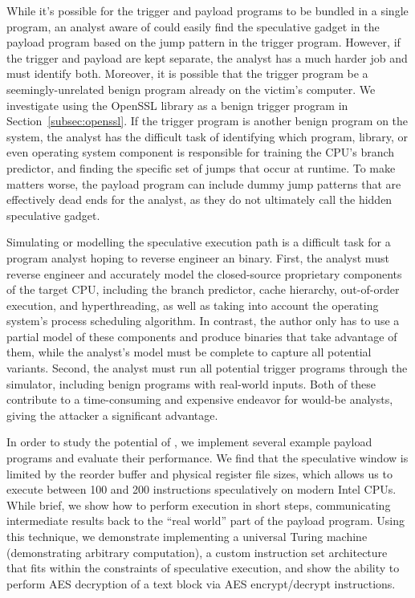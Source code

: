 

\FigHighLevel



While it's possible for the trigger and payload programs to be bundled in a
single program, an analyst aware of \speculake could easily find the speculative
gadget in the payload program based on the jump pattern in the trigger program.
However, if the trigger and payload are kept separate, the analyst has a much
harder job and must identify both.
Moreover, it is possible that the trigger program be a
seemingly-unrelated benign program already on the victim's computer. We
investigate using the OpenSSL library as a benign trigger
program in Section~\ref{subsec:openssl}. If the trigger program is another benign
program on the system, the analyst has the difficult task of identifying which
program, library, or even operating system component is responsible for training
the CPU's branch predictor, and finding the specific set of jumps that occur at
runtime. To make matters worse, the payload program can include dummy jump
patterns that are effectively dead ends for the analyst, as they do not
ultimately call the hidden speculative gadget.


Simulating or modelling the speculative execution path is a difficult task for a
program analyst hoping to reverse engineer an \speculake binary. First, the
analyst must reverse engineer and accurately model the closed-source proprietary
components of the target CPU, including the branch predictor, cache hierarchy,
out-of-order execution, and hyperthreading, as well as taking into account the
operating system's process scheduling algorithm. In contrast, the \speculake
author only has to use a partial model of these components and produce binaries
that take advantage of them, while the analyst's model must be complete to
capture all potential \speculake variants. Second, the analyst must run all
potential trigger programs through the simulator, including benign programs with
real-world inputs. Both of these contribute to a time-consuming and expensive
endeavor for would-be analysts, giving the attacker a significant advantage.

In order to study the potential of \speculake, we implement several example
payload programs and evaluate their performance. We find that the speculative
window is limited by the reorder buffer and physical register file sizes, which
allows us to execute between 100 and 200 instructions speculatively on modern
Intel CPUs. While brief, we show how to perform execution in short steps,
communicating intermediate results back to the ``real world'' part of the
payload program. Using this technique, we demonstrate implementing a universal
Turing machine (demonstrating arbitrary computation), a custom instruction set
architecture that fits within the constraints of speculative execution, and show
the ability to perform AES decryption of a text block via AES encrypt/decrypt
instructions.

